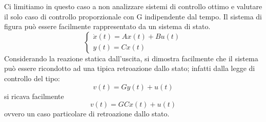 Ci limitiamo in questo caso a non analizzare sistemi di controllo ottimo
e valutare il solo caso di controllo proporzionale con G indipendente
dal tempo.
Il sistema di figura può essere facilmente rappresentato da un sistema
di stato.
\begin{equation}
 \left\{
  \begin{array}{l}
   \dot{x}(t) = Ax(t) + Bu(t) \\
   y(t) = Cx(t)
  \end{array}
 \right.
\end{equation}
Considerando la reazione statica dall'uscita, si dimostra facilmente che
il sistema può essere ricondotto ad una tipica retroazione dallo stato;
infatti dalla legge di controllo del tipo:
\begin{equation}
 v(t) = Gy(t) + u(t)
\end{equation}
si ricava facilmente 
\begin{equation}
v(t) = GCx(t) + u(t)
\end{equation} ovvero un caso particolare di retroazione dallo stato.


